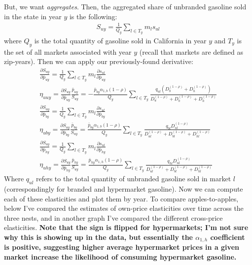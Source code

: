 \documentclass{article}
\begin{document}
But, we want \textit{aggregates}. Then, the aggregated share of unbranded gasoline sold in the state in year $y$ is the following:
\begin{gather}
	S_{uy} = \frac{1}{Q_y} \sum_{l \in T_y} m_l s_{ul} 
\end{gather}
where $Q_y$ is the total quantity of gasoline sold in California in year $y$ and $T_y$ is the set of all markets associated with year $y$ (recall that markets are defined as zip-years). Then we can apply our previously-found derivative:
\begin{gather}
	\frac{\partial S_{uy}}{\partial \bar{p}_{uy}} = \frac{1}{Q_y} \sum_{l \in T_y} m_l \frac{\partial s_{ul}}{\partial \bar{p}_{uy}} \\
	\eta_{uuy} = \frac{\partial S_{uy}}{\partial \bar{p}_{uy}} \frac{\bar{p}_{uy}}{S_{uy}} = - \frac{\bar{p}_{by} \alpha_{1, b} (1-\rho)}{Q_y} \sum_{l \in T_y} \frac{q_{ul} (D_b^{(1-\rho)} + D_h^{(1-\rho)})}{D_u^{(1-\rho)} + D_b^{(1-\rho)} + D_h^{(1-\rho)}} \\
	\frac{\partial S_{uy}}{\partial \bar{p}_{by}} = \frac{1}{Q_y} \sum_{l \in T_y} m_l \frac{\partial s_{ul}}{\partial \bar{p}_{by}} \\
	\eta_{uby} = \frac{\partial S_{uy}}{\partial \bar{p}_{by}} \frac{\bar{p}_{by}}{S_{uy}} = \frac{\bar{p}_{by} \alpha_{1, b} (1-\rho)}{Q_y} \sum_{l \in T_y} \frac{q_{bl} D_{ul}^{(1-\rho)}}{D_{ul}^{(1-\rho)} + D_{bl}^{(1-\rho)} + D_{hl}^{(1-\rho)}} \\
	\frac{\partial S_{uy}}{\partial \bar{p}_{hy}} = \frac{1}{Q_y} \sum_{l \in T_y} m_l \frac{\partial s_{ul}}{\partial \bar{p}_{hy}} \\
	\eta_{uhy} = \frac{\partial S_{uy}}{\partial \bar{p}_{hy}} \frac{\bar{p}_{hy}}{S_{uy}} = \frac{\bar{p}_{hy} \alpha_{1, h} (1-\rho)}{Q_y} \sum_{l \in T_y} \frac{q_{hl} D_{ul}^{(1-\rho)}}{D_{ul}^{(1-\rho)} + D_{bl}^{(1-\rho)} + D_{hl}^{(1-\rho)}}
\end{gather}
Where $q_{ul}$ refers to the total quantity of unbranded gasoline sold in market $l$ (correspondingly for branded and hypermarket gasoline). Now we can compute each of these elasticities and plot them by year. To compare apples-to-apples, below I've compared the estimates of own-price elasticities over time across the three nests, and in another graph I've compared the different cross-price elasticities. \textbf{Note that the sign is flipped for hypermarkets; I'm not sure why this is showing up in the data, but essentially the $\alpha_{1, h}$ coefficient is positive, suggesting higher average hypermarket prices in a given market increase the likelihood of consuming hypermarket gasoline.}
\end{document}
